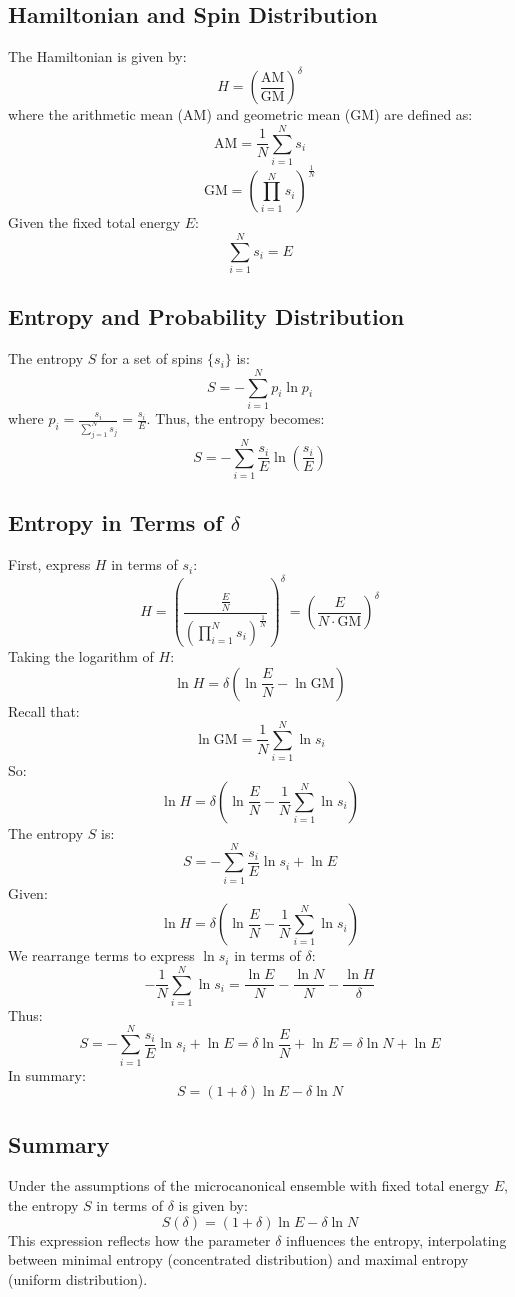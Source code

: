 \documentclass{article}
\begin{document}
\subsection{Hamiltonian and Spin Distribution}

The Hamiltonian is given by:
\[
H = \left( \frac{\text{AM}}{\text{GM}} \right)^\delta
\]
where the arithmetic mean (AM) and geometric mean (GM) are defined as:
\[
\text{AM} = \frac{1}{N} \sum_{i=1}^N s_i
\]
\[
\text{GM} = \left( \prod_{i=1}^N s_i \right)^{\frac{1}{N}}
\]
Given the fixed total energy \(E\):
\[
\sum_{i=1}^N s_i = E
\]
\subsection{Entropy and Probability Distribution}
The entropy \(S\) for a set of spins \(\{s_i\}\) is:
\[
S = -\sum_{i=1}^N p_i \ln p_i
\]
where \(p_i = \frac{s_i}{\sum_{j=1}^N s_j} = \frac{s_i}{E}\). Thus, the entropy becomes:
\[
S = -\sum_{i=1}^N \frac{s_i}{E} \ln \left( \frac{s_i}{E} \right)
\]
\subsection{Entropy in Terms of \(\delta\)}
First, express \(H\) in terms of \(s_i\):
\[
H = \left( \frac{\frac{E}{N}}{\left( \prod_{i=1}^N s_i \right)^{\frac{1}{N}}} \right)^\delta = \left( \frac{E}{N \cdot \text{GM}} \right)^\delta
\]
Taking the logarithm of \(H\):
\[
\ln H = \delta \left( \ln \frac{E}{N} - \ln \text{GM} \right)
\]
Recall that:
\[
\ln \text{GM} = \frac{1}{N} \sum_{i=1}^N \ln s_i
\]
So:
\[
\ln H = \delta \left( \ln \frac{E}{N} - \frac{1}{N} \sum_{i=1}^N \ln s_i \right)
\]
The entropy \(S\) is:
\[
S = -\sum_{i=1}^N \frac{s_i}{E} \ln s_i + \ln E
\]
Given:
\[
\ln H = \delta \left( \ln \frac{E}{N} - \frac{1}{N} \sum_{i=1}^N \ln s_i \right)
\]
We rearrange terms to express \(\ln s_i\) in terms of \(\delta\):
\[
-\frac{1}{N} \sum_{i=1}^N \ln s_i = \frac{\ln E}{N} - \frac{\ln N}{N} - \frac{\ln H}{\delta}
\]
Thus:
\[
S = -\sum_{i=1}^N \frac{s_i}{E} \ln s_i + \ln E = \delta \ln \frac{E}{N} + \ln E = \delta \ln N + \ln E
\]
In summary:
\[
S = (1 + \delta) \ln E - \delta \ln N
\]

\subsection{Summary}

Under the assumptions of the microcanonical ensemble with fixed total energy \(E\), the entropy \(S\) in terms of \(\delta\) is given by:
\[
S(\delta) = (1 + \delta) \ln E - \delta \ln N
\]
This expression reflects how the parameter \(\delta\) influences the entropy, interpolating between minimal entropy (concentrated distribution) and maximal entropy (uniform distribution).
\end{document}
